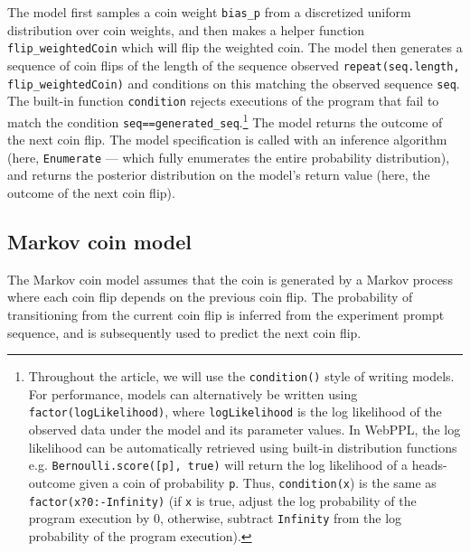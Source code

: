 \documentclass{article}
\begin{document}
%
The model first samples a coin weight \lstinline{bias_p} from a discretized uniform distribution over coin weights, and
then makes a helper function \lstinline{flip_weightedCoin} which will flip the weighted coin.
The model then generates a sequence of coin flips of the length of the sequence observed \lstinline{repeat(seq.length, flip_weightedCoin)} and conditions on this matching the observed sequence \lstinline{seq}.
The built-in function \lstinline{condition} rejects executions of the program that fail to match the condition \lstinline{seq==generated_seq}.\footnote{
Throughout the article, we will use the \lstinline{condition()} style of writing models. For performance, models can alternatively be written using \lstinline{factor(logLikelihood)}, where \lstinline{logLikelihood} is the log likelihood of the observed data under the model and its parameter values. In WebPPL, the log likelihood can be automatically retrieved using built-in distribution functions e.g. \lstinline{Bernoulli.score([p], true)} will return the log likelihood of a heads-outcome given a coin of probability \lstinline{p}.
Thus, \lstinline{condition(x}) is the same as \lstinline{factor(x?0:-Infinity)} (if \lstinline{x} is true, adjust the log probability of the program execution by 0, otherwise, subtract \lstinline{Infinity} from the log probability of the program execution).
}
The model returns the outcome of the next coin flip.
The model specification is called with an inference algorithm (here, \lstinline{Enumerate} --- which fully enumerates the entire probability distribution), and returns the posterior distribution on the model's return value (here, the outcome of the next coin flip).

\subsection{Markov coin model}
\label{s:tutorial:sss:markov}
The Markov coin model assumes that the coin is generated by a Markov process where each coin flip depends on the previous coin flip. The probability of transitioning from the current coin flip is inferred from the experiment prompt sequence, and is subsequently used to predict the next coin flip.
%

%
\end{document}
